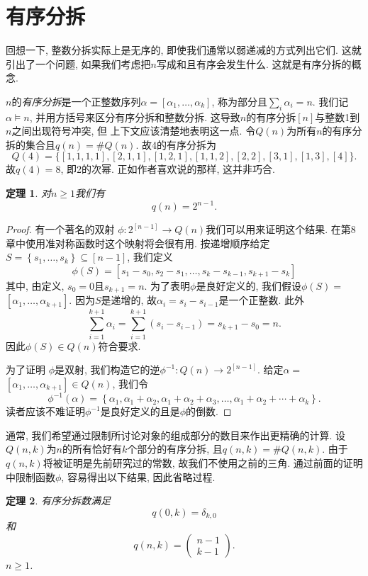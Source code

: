 \documentclass{ctexbook}
\newtheorem{thm}{定理}[section]
\begin{document}
\section{有序分拆}
回想一下, 整数分拆实际上是无序的, 即使我们通常以弱递减的方式列出它们. 这就引出了一个问题, 如果我们考虑把$n$写成和且有序会发生什么.
这就是有序分拆的概念.

$n$的\textsl{有序分拆}是一个正整数序列$\alpha=\left[\alpha_{1}, \ldots, \alpha_{k}\right]$, 称为部分且$\sum_{i} \alpha_{i}=n$.
我们记$\alpha \models n$, 并用方括号来区分有序分拆和整数分拆. 这导致$n$的有序分拆$[n]$与整数1到$n$之间出现符号冲突, 但
上下文应该清楚地表明这一点. 令$Q(n)$为所有$n$的有序分拆的集合且$q(n)=\# Q(n)$. 故4的有序分拆为
$$
Q(4)=\{[1,1,1,1],[2,1,1],[1,2,1],[1,1,2],[2,2],[3,1],[1,3],[4]\}.
$$
故$q(4)=8$, 即2的次幂. 正如作者喜欢说的那样, 这并非巧合.
      \begin{thm}
      	对$n \geqslant 1$我们有
      	$$
      	q(n)=2^{n-1} .
      	$$
      \end{thm}
     \begin{proof}
     	有一个著名的双射 $\phi: 2^{[n-1]} \rightarrow Q(n)$我们可以用来证明这个结果.
     	在第8章中使用准对称函数时这个映射将会很有用. 按递增顺序给定$S=\left\{s_{1}, \ldots, s_{k}\right\} \subseteq[n-1]$,
     	我们定义
     	\begin{equation}
     	\phi(S)=\left[s_{1}-s_{0}, s_{2}-s_{1}, \ldots, s_{k}-s_{k-1}, s_{k+1}-s_{k}\right]
     	\end{equation}
     	其中, 由定义, $s_{0}=0$且$s_{k+1}=n$. 为了表明$\phi$是良好定义的, 我们假设$\phi(S)=$ $\left[\alpha_{1}, \ldots, \alpha_{k+1}\right]$.
     	因为$S$是递增的, 故$\alpha_{i}=s_{i}-s_{i-1}$是一个正整数. 此外
     	$$
     	\sum_{i=1}^{k+1} \alpha_{i}=\sum_{i=1}^{k+1}\left(s_{i}-s_{i-1}\right)=s_{k+1}-s_{0}=n.
     	$$
     	因此$\phi(S) \in Q(n)$符合要求.

     	为了证明 $\phi$是双射, 我们构造它的逆$\phi^{-1}: Q(n) \rightarrow 2^{[n-1]}$. 给定$\alpha=$ $\left[\alpha_{1}, \ldots, \alpha_{k+1}\right] \in Q(n)$, 我们令
     	$$
     	\phi^{-1}(\alpha)=\left\{\alpha_{1}, \alpha_{1}+\alpha_{2}, \alpha_{1}+\alpha_{2}+\alpha_{3}, \ldots, \alpha_{1}+\alpha_{2}+\cdots+\alpha_{k}\right\}.
     	$$
     	读者应该不难证明$\phi^{-1}$是良好定义的且是$\phi $的倒数.
     \end{proof}

通常, 我们希望通过限制所讨论对象的组成部分的数目来作出更精确的计算. 设$Q(n, k)$为$n$的所有恰好有$k$个部分的有序分拆, 且$q(n, k)=\# Q(n, k)$.
由于$q(n, k)$将被证明是先前研究过的常数, 故我们不使用之前的三角. 通过前面的证明中限制函数$\phi$, 容易得出以下结果, 因此省略过程.
   \begin{thm}
   	有序分拆数满足
   	$$
   	q(0, k)=\delta_{k, 0}
   	$$
   	和
   	$$
   	q(n, k)=\left(\begin{array}{l}
   	n-1 \\
   	k-1
   	\end{array}\right).
   	$$
   	$n \geqslant 1$.
   \end{thm}
\end{document}
